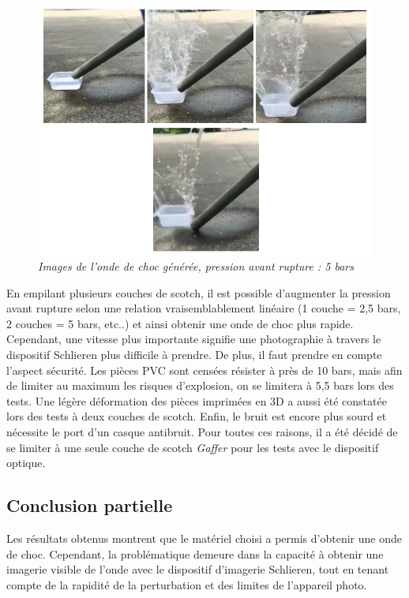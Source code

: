 \begin{figure}[H]
	\centering
	\includegraphics[scale = 0.5]{figures/choc_5bars.png}
	\caption{\small{\textit{Images de l'onde de choc générée, pression avant rupture : 5 bars}}}
	\label{fig:choc_5bars}
\end{figure}
En empilant plusieurs couches de scotch, il est possible d’augmenter la pression avant rupture selon une relation vraisemblablement linéaire (1 couche = 2,5 bars, 2 couches = 5 bars, etc..) et ainsi obtenir une onde de choc plus rapide. Cependant, une vitesse plus importante signifie une photographie à travers le dispositif Schlieren plus difficile à prendre. De plus, il faut prendre en compte l'aspect sécurité. Les pièces PVC sont censées résister à près de 10 bars, mais afin de limiter au maximum les risques d'explosion, on se limitera à 5,5 bars lors des tests. Une légère déformation des pièces imprimées en 3D a aussi été constatée lors des tests à deux couches de scotch. Enfin, le bruit est encore plus sourd et nécessite le port d'un casque antibruit. Pour toutes ces raisons, il a été décidé de se limiter à une seule couche de scotch \textit{Gaffer} pour les tests avec le dispositif optique.
\subsection{Conclusion partielle}
Les résultats obtenus montrent que le matériel choisi a permis d'obtenir une onde de choc. Cependant, la problématique demeure dans la capacité à obtenir une imagerie visible de l'onde avec le dispositif d'imagerie Schlieren, tout en tenant compte de la rapidité de la perturbation et des limites de l'appareil photo.